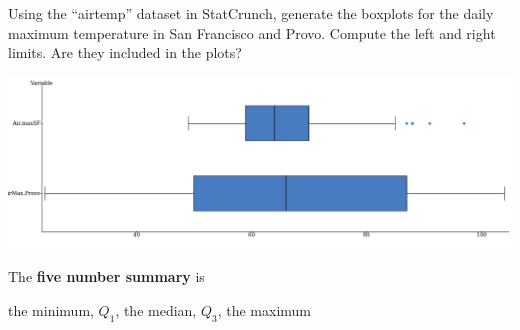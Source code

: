 \documentclass[../mathNotesPreamble]{subfiles}
\begin{document}
  \begin{ex*}
    Using the ``airtemp'' dataset in StatCrunch, generate the boxplots for the daily maximum temperature in San Francisco and Provo. Compute the left and right limits. Are they included in the plots?
  \end{ex*}

  \begin{center}
    \includegraphics[width=0.925\linewidth]{images/math211_sf_provo_temp_boxplots}
  \end{center}
  
  \begin{defn*}
    The \textbf{five number summary} is
    \begin{center}
       the minimum, $Q_1$, the median, $Q_3$, the maximum
    \end{center}
  \end{defn*}

  \pagebreak
\end{document}
